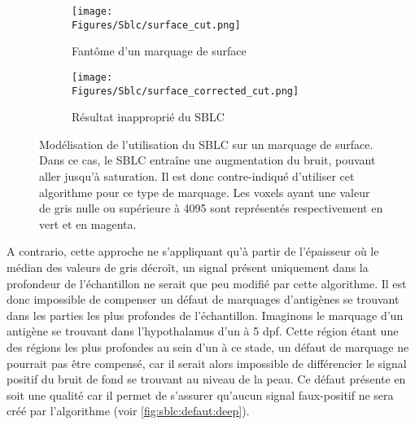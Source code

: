\documentclass[\main/main.tex]{subfiles}
\begin{document}
\begin{figure}
    \centering
    \begin{subfigure}[b]{0.45\textwidth}
        
        \caption{Fantôme d'un marquage de surface}
        \centering \texttt{[image: \\Figures/Sblc/surface\_cut.png]}
        \label{fig:sblc:defaut:surface:fantôme}
    \end{subfigure}
    \begin{subfigure}[b]{0.45\textwidth} 
        \caption{Résultat inapproprié du SBLC}
        \centering \texttt{[image: \\Figures/Sblc/surface\_corrected\_cut.png]}
        \label{fig:sblc:defaut:surface:application}
    \end{subfigure}
    \caption{
        Modélisation de l'utilisation du SBLC sur un marquage de surface.
        \newline
        Dans ce cas, le SBLC entraîne une augmentation du bruit, pouvant aller jusqu'à saturation.
        Il est donc contre\hyp{}indiqué d'utiliser cet algorithme pour ce type de marquage.
        \newline
        Les voxels ayant une valeur de gris nulle ou supérieure à 4095 sont représentés respectivement en vert et en magenta.
        }
    \label{fig:sblc:defaut:surface}
\end{figure}

%
A contrario, cette approche ne s'appliquant qu'à partir de l'épaisseur où le médian des valeurs de gris décroît, un signal présent uniquement dans la profondeur de l'échantillon ne serait que peu modifié par cette algorithme.
%
Il est donc impossible de compenser un défaut de marquages d'antigènes se trouvant dans les parties les plus profondes de l'échantillon.
%
Imaginons le marquage d'un antigène se trouvant dans l'hypothalamus d'un \pz{} à 5 dpf.
%
Cette région étant une des régions les plus profondes au sein d'un \pz{} à ce stade, un défaut de marquage ne pourrait pas être compensé, car il serait alors impossible de différencier le signal positif du bruit de fond se trouvant au niveau de la peau.
%
Ce défaut présente en soit une qualité car il permet de s'assurer qu'aucun signal faux-positif ne sera créé par l'algorithme  (voir \autoref{fig:sblc:defaut:deep}).
\end{document}
